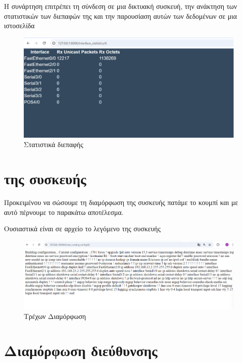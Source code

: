Η συνάρτηση επιτρέπει τη σύνδεση σε μια δικτυακή συσκευή, την ανάκτηση των στατιστικών των διεπαφών της και την παρουσίαση αυτών των δεδομένων σε μια ιστοσελίδα

\FloatBarrier

\begin{figure}[h]
	\centering
	\includegraphics[width=1.0\textwidth]{graphics/interface_statistics.png}
	\caption{Στατιστικά διεπαφής}
\end{figure}


\section{ της συσκευής}

Προκειμένου να σώσουμε τη διαμόρφωση της συσκευής πατάμε το κουμπί
 και με αυτό πέρνουμε το παρακάτω αποτέλεσμα.

Ουσιαστικά είναι σε  αρχείο το λεγόμενο 
της συσκευής

\FloatBarrier

\begin{figure}[h]
	\centering
	\includegraphics[width=1.0\textwidth]{graphics/running_config.png}
	\caption{Τρέχων Διαμόρφωση}
\end{figure}


\section{Διαμόρφωση διεύθυνσης }


